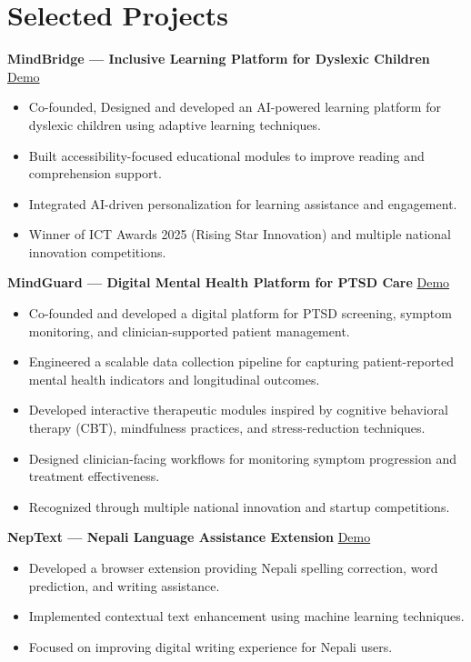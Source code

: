 \documentclass[11pt,a4paper]{article}
\begin{document}
\section*{Selected Projects}
\textbf{MindBridge — Inclusive Learning Platform for Dyslexic Children}
\hfill
\href{https://mindbridge.com}{Demo}
\begin{itemize}[leftmargin=*]
    \item Co-founded, Designed and developed an AI-powered learning platform for dyslexic children using adaptive learning techniques.
    \item Built accessibility-focused educational modules to improve reading and comprehension support.
    \item Integrated AI-driven personalization for learning assistance and engagement.
    \item Winner of ICT Awards 2025 (Rising Star Innovation) and multiple national innovation competitions.
\end{itemize}

\textbf{MindGuard — Digital Mental Health Platform for PTSD Care}
\hfill
\href{https://mindbridge.com}{Demo}
\begin{itemize}[leftmargin=*]
    \item Co-founded and developed a digital platform for PTSD screening, symptom monitoring, and clinician-supported patient management.
    \item Engineered a scalable data collection pipeline for capturing patient-reported mental health indicators and longitudinal outcomes.
    \item Developed interactive therapeutic modules inspired by cognitive behavioral therapy (CBT), mindfulness practices, and stress-reduction techniques.
    \item Designed clinician-facing workflows for monitoring symptom progression and treatment effectiveness.
    \item Recognized through multiple national innovation and startup competitions.
\end{itemize}
\textbf{NepText — Nepali Language Assistance Extension} \hfill
\href{https://mindbridge.com}{Demo}
\begin{itemize}[leftmargin=*]
    \item Developed a browser extension providing Nepali spelling correction, word prediction, and writing assistance.
    \item Implemented contextual text enhancement using machine learning techniques.
    \item Focused on improving digital writing experience for Nepali users.
\end{itemize}
\end{document}
